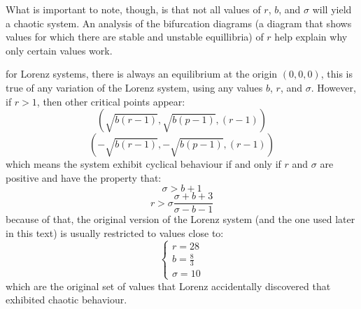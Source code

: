 \par What is important to note, though, is that not all values of $r$, $b$, and $\sigma$ will yield a chaotic system. An analysis of the bifurcation diagrams (a diagram that shows values for which there are stable and unstable equillibria) of $r$ help explain why only certain values work.

\par for Lorenz systems, there is always an equilibrium at the origin $(0,0,0)$, this is true of any variation of the Lorenz system, using any values $b$, $r$, and $\sigma$.  However, if $r>1$, then other critical points appear:
%
\begin{equation}
(\sqrt{b(r-1)},\sqrt{b(p-1)},(r-1))
\end{equation}
\begin{equation}
(-\sqrt{b(r-1)},-\sqrt{b(p-1)},(r-1))
\end{equation}
%
which means the system exhibit cyclical behaviour if and only if $r$ and $\sigma$ are positive and have the property that:
%
\begin{equation}
\sigma > b + 1 
\end{equation}
\begin{equation}
r > \sigma \frac{\sigma + b + 3}{\sigma - b - 1}
\end{equation}
%
because of that, the original version of the Lorenz system (and the one used later in this text) is usually restricted to values close to:
\begin{equation}
\begin{cases} 
r = 28 \\ 
b = \frac{8}{3} \\ 
\sigma = 10
\end{cases}
\end{equation}
%
which are the original set of values that Lorenz accidentally discovered that exhibited chaotic behaviour.

